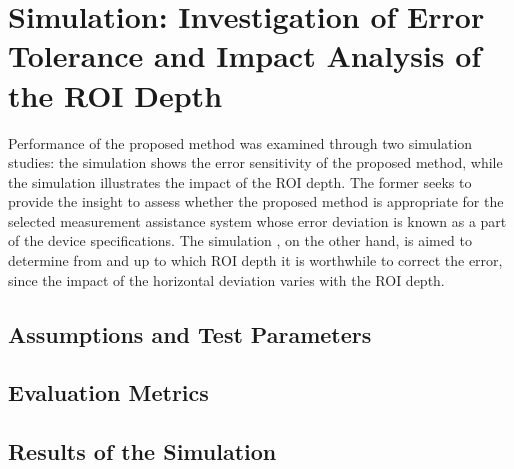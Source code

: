 \documentclass[10pt,twocolumn,a4paper,conference]{IEEEtran}
\begin{document}
\section{Simulation: Investigation of Error Tolerance and Impact Analysis of the ROI Depth} \label{sec:simulation}  
%
%
%
%
%
Performance of the proposed method was examined through two simulation studies: the simulation  shows the error sensitivity of the proposed method, while the simulation  illustrates the impact of the ROI depth. The former seeks to provide the insight to assess whether the proposed method is appropriate for the selected measurement assistance system whose error deviation is known as a part of the device specifications. The simulation , on the other hand, is aimed to determine from and up to which ROI depth it is worthwhile to correct the error, since the impact of the horizontal deviation varies with the ROI depth. \par


\subsection{Assumptions and Test Parameters} 
 

\subsection{Evaluation Metrics} 


\subsection{Results of the Simulation } 

\end{document}
